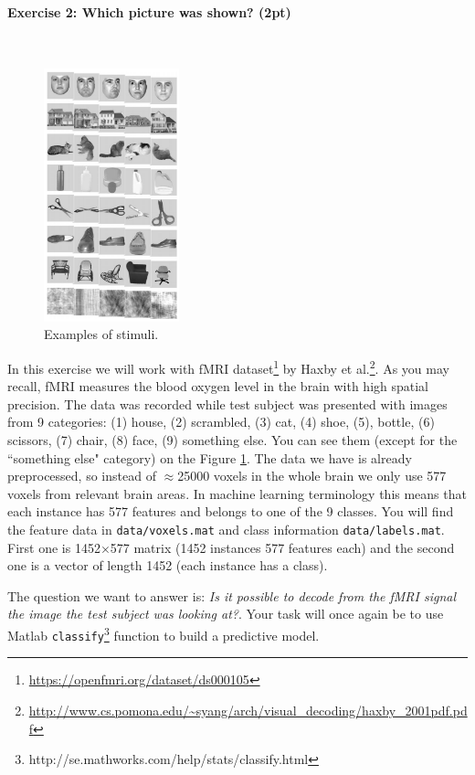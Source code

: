 \documentclass[a4paper,11pt]{article}
\newenvironment{exercise}[3]{\paragraph{Exercise #1: #2 (#3pt)}\ \\}{
\medskip}
\begin{document}
\pagebreak
%
%
\begin{exercise}{2}{Which picture was shown?}{2}
\begin{figure}
	\centering
	\vspace{-45pt}
	\includegraphics[width=0.35\textwidth]{stimuli.png}
	\caption{Examples of stimuli.}
	\label{fig:stimuli}
	\vspace{-20pt}
\end{figure}
In this exercise we will work with fMRI dataset\footnote{\url{https://openfmri.org/dataset/ds000105}} by Haxby et al.\footnote{\url{http://www.cs.pomona.edu/~syang/arch/visual_decoding/haxby_2001pdf.pdf}}. As you may recall, fMRI measures the blood oxygen level in the brain with high spatial precision. The data was recorded while test subject was presented with images from 9 categories: (1) house,  (2) scrambled, (3) cat, (4) shoe, (5), bottle, (6) scissors, (7) chair, (8) face, (9) something else. You can see them (except for the ``something else" category) on the Figure \ref{fig:stimuli}. The data we have is already preprocessed, so instead of $\approx$25000 voxels in the whole brain we only use 577 voxels from relevant brain areas. In machine learning terminology this means that each instance has 577 features and belongs to one of the 9 classes. You will find the feature data in \texttt{data/voxels.mat} and class information \texttt{data/labels.mat}. First one is 1452$\times$577 matrix (1452 instances 577 features each) and the second one is a vector of length 1452 (each instance has a class).

The question we want to answer is: \emph{Is it possible to decode from the fMRI signal the image the test subject was looking at?}. Your task will once again be to use Matlab \texttt{classify}\footnote{http://se.mathworks.com/help/stats/classify.html} function to build a predictive model.\\


\end{exercise}
\end{document}
